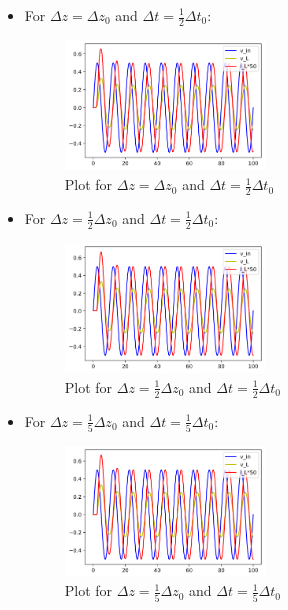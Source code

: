 \documentclass{article}
\begin{document}
\begin{itemize}
            \item[] For $\Delta z = \Delta z_0$ and $\Delta t = \frac{1}{2}\Delta t_0$: 
            
                \begin{figure}[H]
                    \centering
                    \includegraphics[width=0.5\textwidth]{img/z0_t02.png}
                    \caption{Plot for $\Delta z = \Delta z_0$ and $\Delta t = \frac{1}{2}\Delta t_0$}
                    \label{fig:z0-t02}
                \end{figure}

            \item[] For $\Delta z = \frac{1}{2}\Delta z_0$ and $\Delta t = \frac{1}{2}\Delta t_0$: 
            
                \begin{figure}[H]
                    \centering
                    \includegraphics[width=0.5\textwidth]{img/z02_t02.png}
                    \caption{Plot for $\Delta z = \frac{1}{2}\Delta z_0$ and $\Delta t = \frac{1}{2}\Delta t_0$}
                    \label{fig:z02-t02}
                \end{figure}

            \item[] For $\Delta z = \frac{1}{5}\Delta z_0$ and $\Delta t = \frac{1}{5}\Delta t_0$: 
            
                \begin{figure}[H]
                    \centering
                    \includegraphics[width=0.5\textwidth]{img/z05_t05.png}
                    \caption{Plot for $\Delta z = \frac{1}{5}\Delta z_0$ and $\Delta t = \frac{1}{5}\Delta t_0$}
                    \label{fig:z05-t05}
                \end{figure}
        \end{itemize}
\end{document}
